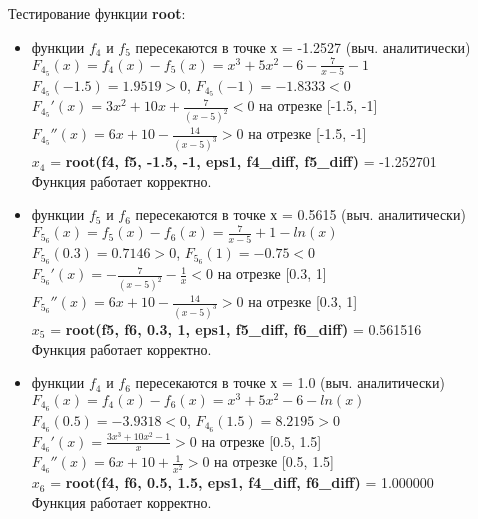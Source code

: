 \documentclass[a4paper,12pt,titlepage,finall]{article}
\begin{document}
{Тестирование функции {\bf \ttfamily root}:}
\begin{itemize}
\item функции $f_4$ и $f_5$ пересекаются в точке х = -1.2527 (выч. аналитически)\\
$F_4_5(x) = f_4(x) - f_5(x) = x^3 + 5x^2 - 6 - \frac{7}{x-5} - 1$ \\
$F_4_5(-1.5) = 1.9519 > 0$, $F_4_5(-1) = -1.8333 < 0$ \\
$F_4_5'(x) = 3x^2 + 10x + \frac{7}{(x-5)^2} < 0$ на отрезке [-1.5, -1]\\
$F_4_5''(x) = 6x + 10 - \frac{14}{(x-5)^3} > 0$ на отрезке [-1.5, -1]\\
$x_4$ = {\bf \ttfamily root(f4, f5, -1.5, -1, eps1, f4\_diff, f5\_diff)} = -1.252701 \\
Функция работает корректно.
\item функции $f_5$ и $f_6$ пересекаются в точке х = 0.5615 (выч. аналитически)\\
$F_5_6(x) = f_5(x) - f_6(x) = \frac{7}{x-5} + 1 - ln(x)$ \\
$F_5_6(0.3) = 0.7146 > 0$, $F_5_6(1) = -0.75 < 0$ \\
$F_5_6'(x) = -\frac{7}{(x-5)^2} - \frac{1}{x} < 0$ на отрезке [0.3, 1]\\
$F_5_6''(x) = 6x + 10 - \frac{14}{(x-5)^3} > 0$ на отрезке [0.3, 1]\\
$x_5$ = {\bf \ttfamily root(f5, f6, 0.3, 1, eps1, f5\_diff, f6\_diff)} = 0.561516 \\
Функция работает корректно.
\item функции $f_4$ и $f_6$ пересекаются в точке х = 1.0 (выч. аналитически)\\
$F_4_6(x) = f_4(x) - f_6(x) = x^3 + 5x^2 - 6 - ln(x)$ \\
$F_4_6(0.5) = -3.9318 < 0$, $F_4_6(1.5) = 8.2195 > 0$ \\
$F_4_6'(x) = \frac{3x^3 + 10x^2 - 1}{x} > 0$ на отрезке [0.5, 1.5]\\
$F_4_6''(x) = 6x + 10 + \frac{1}{x^2} > 0$ на отрезке [0.5, 1.5]\\
$x_6$ = {\bf \ttfamily root(f4, f6, 0.5, 1.5, eps1, f4\_diff, f6\_diff)} = 1.000000 \\
Функция работает корректно.
\end{itemize}
\end{document}
